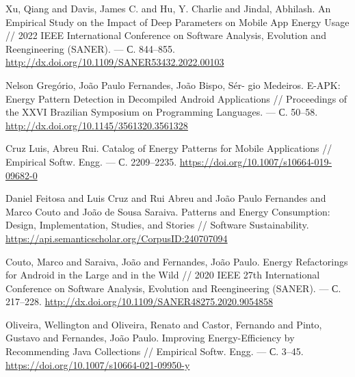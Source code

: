 \documentclass{math-mech-sci}
\begin{document}
\begin{thebibliography}{8}

 Xu, Qiang and Davis, James C. and Hu, Y. Charlie and Jindal, Abhilash. An Empirical Study on the Impact of Deep Parameters on Mobile App Energy Usage // %
  2022 IEEE International Conference on Software Analysis, Evolution and Reengineering (SANER). --- %
  С. 844--855.
  \href{http://dx.doi.org/10.1109/SANER53432.2022.00103}{http://dx.doi.org/10.1109/SANER53432.2022.00103}

 Nelson Gregório, João Paulo Fernandes, João Bispo, Sér-
gio Medeiros. E-APK: Energy Pattern Detection in Decompiled Android Applications // %
  Proceedings of the XXVI Brazilian Symposium on Programming Languages. --- %
  С. 50--58.
  \href{http://dx.doi.org/10.1145/3561320.3561328}{http://dx.doi.org/10.1145/3561320.3561328}

 Cruz Luis, Abreu Rui. Catalog of Energy Patterns for Mobile Applications // %
  Empirical Softw. Engg.  --- %
  С. 2209--2235.
  \href{https://doi.org/10.1007/s10664-019-09682-0}{https://doi.org/10.1007/s10664-019-09682-0}

 Daniel Feitosa and Luis Cruz and Rui Abreu and Jo{\~a}o Paulo Fernandes and Marco Couto and Jo{\~a}o de Sousa Saraiva. Patterns and Energy Consumption: Design, Implementation, Studies, and Stories //
  Software Sustainability.
  \href{https://api.semanticscholar.org/CorpusID:240707094}{https://api.semanticscholar.org/CorpusID:240707094}

 Couto, Marco and Saraiva, João and Fernandes, João Paulo. Energy Refactorings for Android in the Large and in the Wild //
  2020 IEEE 27th International Conference on Software Analysis, Evolution and Reengineering (SANER).  --- %
  С. 217--228.
  \href{http://dx.doi.org/10.1109/SANER48275.2020.9054858}{http://dx.doi.org/10.1109/SANER48275.2020.9054858}

 Oliveira, Wellington and Oliveira, Renato and Castor, Fernando and Pinto, Gustavo and Fernandes, Jo\~{a}o Paulo. Improving Energy-Efficiency by Recommending Java Collections //
  Empirical Softw. Engg.  --- %
  С. 3--45.
  \href{https://doi.org/10.1007/s10664-021-09950-y}{https://doi.org/10.1007/s10664-021-09950-y}


\end{thebibliography}
\end{document}
